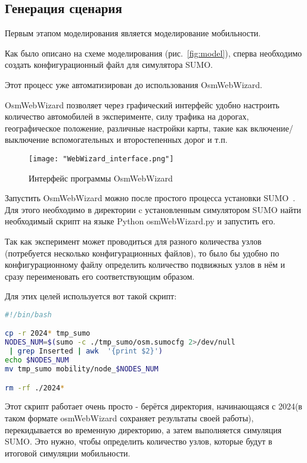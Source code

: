 \subsection*{Генерация сценария}

Первым этапом моделирования является моделирование мобильности.

Как было описано на схеме моделирования (рис.~\ref{fig:model}), сперва необходимо создать конфигурационный файл для симулятора SUMO.~\cite{seema2022simulation}

Этот процесс уже автоматизирован до использования OsmWebWizard. 

OsmWebWizard позволяет через графический интерфейс удобно настроить количество автомобилей в эксперименте, силу трафика на дорогах, географическое положение, различные настройки карты, такие как включение/выключение вспомогательных и второстепенных дорог и т.п.

\begin{figure}
  \centering
  \texttt{[image: "WebWizard\_interface.png"]}
  \caption{Интерфейс программы OsmWebWizard}
  \label{fig:webwizard_interface}
\end{figure}

Запустить OsmWebWizard можно после простого процесса установки SUMO~\cite{sumo_docs}. Для этого необходимо в директории c установленным симулятором SUMO найти необходимый скрипт на языке Python osmWebWizard.py и запустить его.

Так как эксперимент может проводиться для разного количества узлов (потребуется несколько конфигурационных файлов), то было бы удобно по конфигурационному файлу определить количество подвижных узлов в нём и сразу переименовать его соответствующим образом.

Для этих целей используется вот такой скрипт:

\begin{lstlisting}[language=bash, style=mystyle, caption=Скрипт для разметки конфиг-файлов по количеству узлов]
#!/bin/bash

cp -r 2024* tmp_sumo
NODES_NUM=$(sumo -c ./tmp_sumo/osm.sumocfg 2>/dev/null
 | grep Inserted | awk  '{print $2}')
echo $NODES_NUM
mv tmp_sumo mobility/node_$NODES_NUM

rm -rf ./2024*

\end{lstlisting}

Этот скрипт работает очень просто - берётся директория, начинающаяся с 2024(в таком формате osmWebWizard сохраняет результаты своей работы), перекидывается во временную директорию, а затем выполняется симуляция SUMO. Это нужно, чтобы определить количество узлов, которые будут в итоговой симуляции мобильности. 

